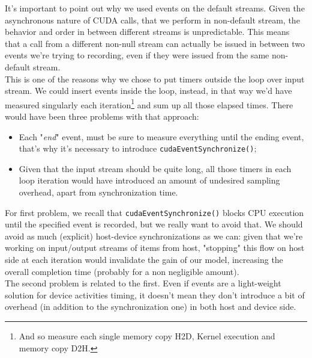 It's important to point out why we used events on the default streams. 
Given the asynchronous nature of CUDA calls, that we perform in non-default stream, the behavior and order in between different streams is unpredictable. This means that a call from a different non-null stream can actually be issued in between two events we're trying to recording, even if they were issued from the same non-default stream.\\
This is one of the reasons why we chose to put timers outside the loop over input stream.
We could insert events inside the loop, instead, in that way we'd have measured singularly each iteration\footnote{And so measure each single memory copy H2D, Kernel execution and memory copy D2H.} and sum up all those elapsed times.
There would have been three problems with that approach:
\begin{itemize}
	\item Each "\textit{end}" event, must be sure to measure everything until the ending event, that's why it's necessary to introduce \texttt{cudaEventSynchronize()};
	\item Given that the input stream should be quite long, all those timers in each loop iteration would have introduced an amount of undesired sampling overhead, apart from synchronization time.
\end{itemize}

For first problem, we recall that \texttt{cudaEventSynchronize()} blocks CPU execution until the specified event is recorded, but we really want to avoid that.
We should avoid as much (explicit) host-device synchronizations as we can: given that we're working on input/output streams of items from host, "stopping" this flow on host side at each iteration would invalidate the gain of our model, increasing the overall completion time (probably for a non negligible amount).\\
The second problem is related to the first. Even if events are a light-weight solution for device activities timing, it doesn't mean they don't introduce a bit of overhead (in addition to the synchronization one) in both host and device side.

